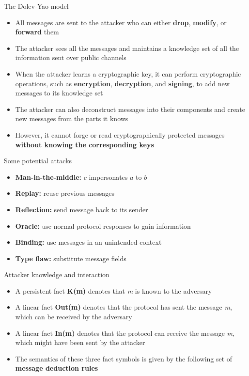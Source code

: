 \documentclass[11pt,aspectratio=169]{beamer}
\begin{document}
\begin{frame}[fragile]{The Dolev-Yao model}
    \begin{itemize}
        \item All messages are sent to the attacker who can either
              \textbf{drop}, \textbf{modify}, or \textbf{forward} them
        \item The attacker sees all the messages and maintains a knowledge set 
              of all the information sent over public channels
        \item When the attacker learns a cryptographic key, it can perform 
              cryptographic operations, such as \textbf{encryption},
              \textbf{decryption}, and \textbf{signing}, to add new messages to 
              its knowledge set
        \item The attacker can also deconstruct messages into their components 
              and create new messages from the parts it knows
        \item However, it cannot forge or read cryptographically protected 
              messages \textbf{without knowing the corresponding keys}
    \end{itemize}
\end{frame}

\begin{frame}[fragile]{Some potential attacks}
    \begin{itemize}
        \item[] \textbf{Man-in-the-middle:} $c$ impersonates $a$ to $b$
        \item[] \textbf{Replay:} reuse previous messages
        \item[] \textbf{Reflection:} send message back to its sender
        \item[] \textbf{Oracle:} use normal protocol responses to gain 
                                 information
        \item[] \textbf{Binding:} use messages in an unintended context
        \item[] \textbf{Type flaw:} substitute message fields
    \end{itemize}
\end{frame}

\begin{frame}[fragile]{Attacker knowledge and interaction}
    \begin{itemize}
        \item A persistent fact \textbf{K(m)} denotes that \textit{m} is known 
              to the adversary
        \item A linear fact \textbf{Out(m)} denotes that the protocol has sent 
              the message \textit{m}, which can be received by the adversary
        \item A linear fact \textbf{In(m)} denotes that the protocol can 
              receive the message \textit{m}, which might have been sent by the 
              attacker
        \item The semantics of these three fact symbols is given by the 
              following set of \textbf{message deduction rules}
    \end{itemize}
\end{frame}
\end{document}
